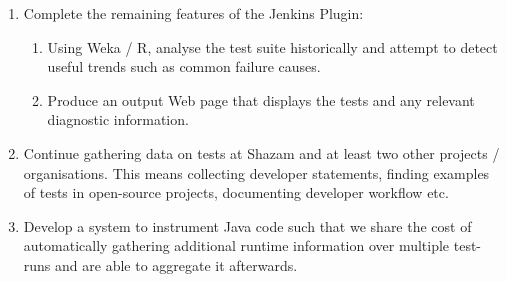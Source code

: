 \begin{enumerate}

	\item Complete the remaining features of the Jenkins Plugin:
	\begin{enumerate}

		\item Using Weka / R, analyse the test suite historically and attempt to
		detect useful trends such as common failure causes.
		\item Produce an output Web page that displays the \flaky tests and any
		relevant diagnostic information.

	\end{enumerate}
	\item Continue gathering data on \flaky tests at Shazam and at least two other
	projects / organisations. This means collecting developer statements, finding
	examples of \flaky tests in open-source projects, documenting developer
	workflow etc.
	\item Develop a system to instrument Java code such that we share the cost of
	automatically gathering additional runtime information over multiple test-runs
	and are able to aggregate it afterwards.

\end{enumerate}

\newpage

\setcounter{section}{\value{oldSectionCounter}}
\setcounter{page}{\value{oldPageCounter}}
